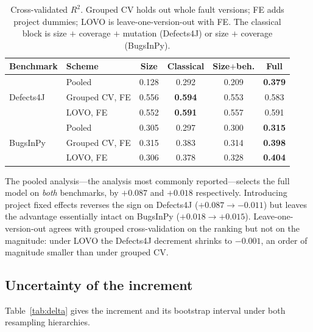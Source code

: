 \documentclass[preprint,12pt]{elsarticle}
\begin{document}
\begin{table}[t]
\centering
\caption{Cross-validated $R^2$. Grouped CV holds out whole fault versions;
FE adds project dummies; LOVO is leave-one-version-out with FE. The
classical block is size $+$ coverage $+$ mutation (Defects4J) or size $+$
coverage (BugsInPy).}
\label{tab:models}
\begin{tabular}{llcccc}
\toprule
Benchmark & Scheme & Size & Classical & Size$+$beh. & Full \\
\midrule
\multirow{3}{*}{Defects4J}
 & Pooled        & 0.128 & 0.292 & 0.209 & \textbf{0.379} \\
 & Grouped CV, FE & 0.556 & \textbf{0.594} & 0.553 & 0.583 \\
 & LOVO, FE       & 0.552 & \textbf{0.591} & 0.557 & 0.591 \\
\midrule
\multirow{3}{*}{BugsInPy}
 & Pooled        & 0.305 & 0.297 & 0.300 & \textbf{0.315} \\
 & Grouped CV, FE & 0.315 & 0.383 & 0.314 & \textbf{0.398} \\
 & LOVO, FE       & 0.306 & 0.378 & 0.328 & \textbf{0.404} \\
\bottomrule
\end{tabular}
\end{table}

The pooled analysis---the analysis most commonly reported---selects the
full model on \emph{both} benchmarks, by $+0.087$ and $+0.018$
respectively. Introducing project fixed effects reverses the sign on
Defects4J ($+0.087 \to -0.011$) but leaves the advantage essentially intact
on BugsInPy ($+0.018 \to +0.015$). Leave-one-version-out agrees with
grouped cross-validation on the ranking but not on the magnitude: under
LOVO the Defects4J decrement shrinks to $-0.001$, an order of magnitude
smaller than under grouped CV.

\subsection{Uncertainty of the increment}

Table~\ref{tab:delta} gives the increment and its bootstrap interval under
both resampling hierarchies.
\end{document}
